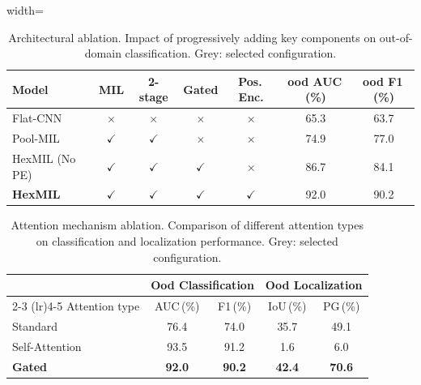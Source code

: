 \documentclass[sigconf, screen, review, anonymous]{acmart}
\begin{document}
\begin{table}[t]
    \centering
    \begin{adjustbox}{width=\columnwidth}
    \renewcommand{\arraystretch}{1.3}
    \newcommand{\cmark}{\textcolor{green!55!black}{$\checkmark$}}%
    \newcommand{\xmark}{\textcolor{red!70!black}{$\times$}}%
    \begin{tabular}{l cccc cc}
        \toprule
        Model & MIL & 2-stage & Gated & Pos.\,Enc. & ood AUC\,(\%) & ood F1\,(\%) \\
        \midrule
        Flat-CNN         & \xmark & \xmark & \xmark & \xmark & 65.3 & 63.7 \\
        Pool-MIL         & \cmark & \cmark & \xmark & \xmark & 74.9 & 77.0 \\
        HexMIL (No PE)   & \cmark & \cmark & \cmark & \xmark & 86.7 & 84.1 \\
        \rowcolor{mygray}
        \textbf{HexMIL}  & \cmark & \cmark & \cmark & \cmark & 92.0 & 90.2 \\
        \bottomrule
    \end{tabular}
    \end{adjustbox}
    \caption{%
    Architectural ablation. Impact of progressively adding key components on out-of-domain classification.   \colorbox{mygray}{Grey}: selected configuration.
    }
    \label{tab:abl_components}
\end{table}

\begin{table}[t]
    \centering
    \renewcommand{\arraystretch}{1.2}
    \begin{tabular}{l cc cc}
        \toprule
        & \multicolumn{2}{c}{Ood Classification} & \multicolumn{2}{c}{Ood Localization} \\
        \cmidrule(lr){2-3} \cmidrule(lr){4-5}
        Attention type & AUC\,(\%) & F1\,(\%) & IoU\,(\%) & PG\,(\%) \\
        \midrule
        Standard        & 76.4 & 74.0 & 35.7 & 49.1 \\
        Self-Attention  & 93.5 & 91.2 & 1.6 &  6.0  \\
        \rowcolor{mygray}
        \textbf{Gated}   & \textbf{92.0} & \textbf{90.2} & \textbf{42.4} & \textbf{70.6} \\
        \bottomrule
    \end{tabular}
    \caption{
    Attention mechanism ablation. Comparison of different attention types on classification and localization performance.
    \colorbox{mygray}{Grey}: selected configuration.   }
    \label{tab:abl_attention}
\end{table}
\end{document}

